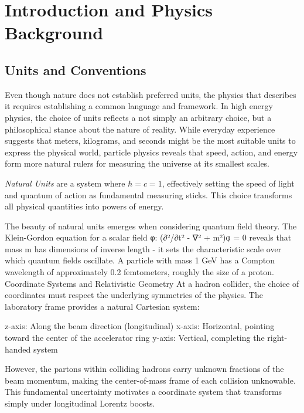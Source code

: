 \chapter{Introduction and Physics Background}
\section{Units and Conventions}
\label{sec:units_and_conventions}
    Even though nature does not establish preferred units, the physics that describes it requires establishing a common language and framework.
    In high energy physics, the choice of units reflects a not simply an arbitrary choice, but a philosophical stance about the nature of reality.
    While everyday experience suggests that meters, kilograms, and seconds might be the most suitable units to express the physical world, particle physics reveals that speed, action, and energy form more natural rulers for measuring the universe at its smallest scales.
    \begin{definition}
        \emph{Natural Units} are a system where \(\hbar = c = 1\), effectively setting the speed of light and quantum of action as fundamental measuring sticks.
        This choice transforms all physical quantities into powers of energy.
    \end{definition}
    

The beauty of natural units emerges when considering quantum field theory. The Klein-Gordon equation for a scalar field φ:
(∂²/∂t² - ∇² + m²)φ = 0
reveals that mass m has dimensions of inverse length - it sets the characteristic scale over which quantum fields oscillate. A particle with mass 1 GeV has a Compton wavelength of approximately 0.2 femtometers, roughly the size of a proton.
Coordinate Systems and Relativistic Geometry
At a hadron collider, the choice of coordinates must respect the underlying symmetries of the physics. The laboratory frame provides a natural Cartesian system:

z-axis: Along the beam direction (longitudinal)
x-axis: Horizontal, pointing toward the center of the accelerator ring
y-axis: Vertical, completing the right-handed system

However, the partons within colliding hadrons carry unknown fractions of the beam momentum, making the center-of-mass frame of each collision unknowable. This fundamental uncertainty motivates a coordinate system that transforms simply under longitudinal Lorentz boosts.

